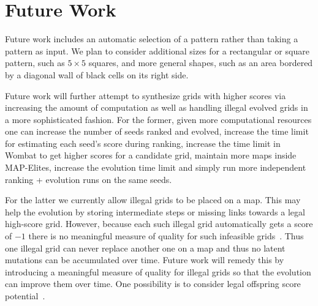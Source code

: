 \section{Future Work}

Future work includes an automatic selection of a pattern rather than taking a pattern as input.
We plan to consider additional sizes for a rectangular or square pattern, such as $5 \times 5$ squares, and 
more general shapes, such as an area bordered by a diagonal wall of black cells on its right side.

Future work will further attempt to synthesize grids with higher scores via increasing the amount of computation as well as handling illegal evolved grids in a more sophisticated fashion. For the former, given more computational resources one can increase the number of seeds ranked and evolved, increase the time limit for estimating each seed's score during ranking, increase the time limit in {\sc Wombat} to get higher scores for a candidate grid, maintain more maps inside MAP-Elites, increase the evolution time limit and simply run more independent ranking + evolution runs on the same seeds. 

For the latter we currently allow illegal grids to be placed on a map. This may help the evolution by storing intermediate steps or missing links towards a legal high-score grid. However, because each such illegal grid automatically gets a score of $-1$ there is no meaningful measure of quality for such infeasible grids~\cite{FI2Pop}. Thus one illegal grid can never replace another one on a map and thus no latent mutations can be accumulated over time. Future work will remedy this by introducing a meaningful measure of quality for illegal grids so that the evolution can improve them over time. One possibility is to consider legal offspring score potential~\cite{Gallotta_2022}.